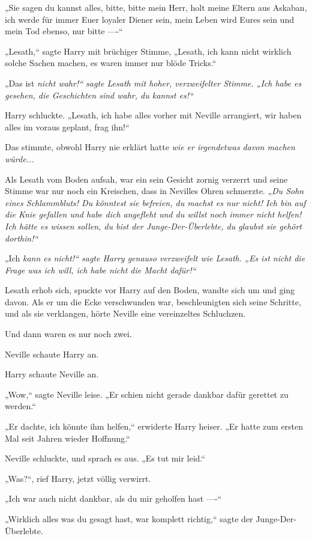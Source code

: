 {„Sie sagen du kannst alles, bitte, bitte mein Herr, holt meine Eltern aus Askaban, ich werde für immer Euer loyaler Diener sein, mein Leben wird Eures sein und mein Tod ebenso, nur bitte ----“

„Lesath,“ sagte Harry mit brüchiger Stimme, „Lesath, ich kann nicht wirklich solche Sachen machen, es waren immer nur blöde Tricks.“

„Das ist \emph{nicht wahr!“ sagte Lesath mit hoher, verzweifelter Stimme. „Ich \emph{habe es gesehen,} die Geschichten sind wahr, du \emph{kannst} es!“}

Harry schluckte. „Lesath, ich habe alles vorher mit Neville arrangiert, wir haben alles im voraus geplant, frag ihn!“

Das stimmte, obwohl Harry nie erklärt hatte \emph{wie er irgendetwas davon machen würde...}

Als Lesath vom Boden aufsah, war ein sein Gesicht zornig verzerrt und seine Stimme war nur noch ein Kreischen, dass in Nevilles Ohren schmerzte. „\emph{Du Sohn eines Schlammbluts! Du könntest sie befreien, du machst es nur nicht! Ich bin auf die Knie gefallen und habe dich angefleht und du willst noch immer nicht helfen! Ich hätte es wissen sollen, du bist der Junge-Der-Überlebte, du glaubst sie gehört \emph{dorthin!“}}

„Ich \emph{kann es nicht!“ sagte Harry genauso verzweifelt wie Lesath. „Es ist nicht die Frage was ich will, ich habe nicht die \emph{Macht} dafür!“}

Lesath erhob sich, spuckte vor Harry auf den Boden, wandte sich um und ging davon. Als er um die Ecke verschwunden war, beschleunigten sich seine Schritte, und als sie verklangen, hörte Neville eine vereinzeltes Schluchzen.

Und dann waren es nur noch zwei.

Neville schaute Harry an.

Harry schaute Neville an.

„Wow,“ sagte Neville leise. „Er schien nicht gerade dankbar dafür gerettet zu werden.“

„Er dachte, ich könnte ihm helfen,“ erwiderte Harry heiser. „Er hatte zum ersten Mal seit Jahren wieder Hoffnung.“

Neville schluckte, und sprach es aus. „Es tut mir leid.“

„Was?“, rief Harry, jetzt völlig verwirrt.

„Ich war auch nicht dankbar, als du mir geholfen hast ----“

„Wirklich alles was du gesagt hast, war komplett richtig,“ sagte der Junge-Der-Überlebte.

}
